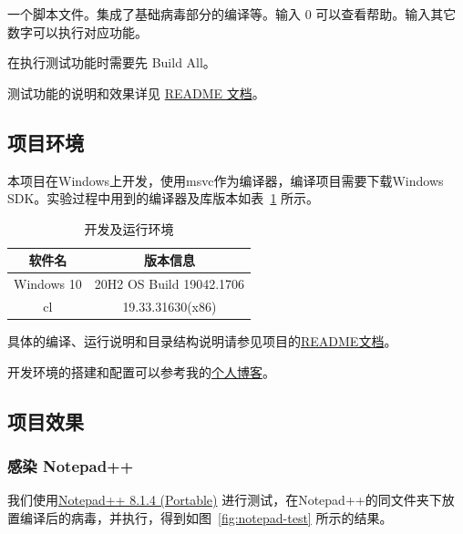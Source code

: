 \documentclass[UTF8]{ctexart}
\begin{document}
    一个脚本文件。集成了基础病毒部分的编译等。输入 0 可以查看帮助。输入其它数字可以执行对应功能。

    在执行测试功能时需要先 Build All。

    测试功能的说明和效果详见 \href{https://github.com/Qing-LKY/PE-Virus/blob/master/README.md}{README 文档}。

    \subsection{项目环境}
    
    本项目在Windows上开发，使用msvc作为编译器，编译项目需要下载Windows SDK。实验过程中用到的编译器及库版本如表~\ref{tab:environment} 所示。

    \begin{table}[h]
        \centering
        \begin{tabular}{|c|c|}
            \hline
            软件名&版本信息 \\ \hline 
            Windows 10& 20H2 OS Build 19042.1706 \\
            cl&19.33.31630(x86) \\
            \hline
        \end{tabular}
        \caption{开发及运行环境}
        \label{tab:environment}
    \end{table}
    
    具体的编译、运行说明和目录结构说明请参见项目的\href{https://github.com/Qing-LKY/PE-Virus/blob/master/README.md}{README文档}。

    开发环境的搭建和配置可以参考我的\href{https://qing-lky.github.io/2022/10/24/VScode-\%E9\%85\%8D\%E7\%BD\%AE-MSVC-\%E5\%BC\%80\%E5\%8F\%91\%E7\%8E\%AF\%E5\%A2\%83/}{个人博客}。
    
    \subsection{项目效果}
    
    \subsubsection{感染 Notepad++}
    
    我们使用\href{https://github.com/notepad-plus-plus/notepad-plus-plus/releases/download/v8.1.4/npp.8.1.4.portable.zip}{Notepad++ 8.1.4 (Portable)} 进行测试，在Notepad++的同文件夹下放置编译后的病毒，并执行，得到如图~\ref{fig:notepad-test} 所示的结果。
\end{document}
